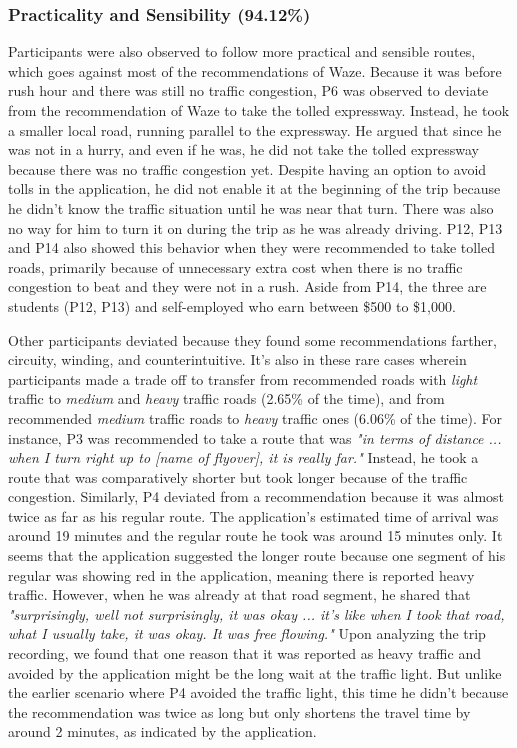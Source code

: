 \subsubsection{Practicality and Sensibility (94.12\%)}
Participants were also observed to follow more practical and sensible routes, which goes against most of the recommendations of Waze. Because it was before rush hour and there was still no traffic congestion, P6 was observed to deviate from the recommendation of Waze to take the tolled expressway. Instead, he took a smaller local road, running parallel to the expressway. He argued that since he was not in a hurry, and even if he was, he did not take the tolled expressway because there was no traffic congestion yet. Despite having an option to avoid tolls in the application, he did not enable it at the beginning of the trip because he didn't know the traffic situation until he was near that turn. There was also no way for him to turn it on during the trip as he was already driving. P12, P13 and P14 also showed this behavior when they were recommended to take tolled roads, primarily because of unnecessary extra cost when there is no traffic congestion to beat and they were not in a rush. Aside from P14, the three are students (P12, P13) and self-employed who earn between \$500 to \$1,000.

Other participants deviated because they found some recommendations farther, circuity, winding, and counterintuitive. It's also in these rare cases wherein participants made a trade off to transfer from recommended roads with \emph{light} traffic to \emph{medium} and \emph{heavy} traffic roads (2.65\% of the time), and from recommended \emph{medium} traffic roads to \emph{heavy} traffic ones (6.06\% of the time). For instance, P3 was recommended to take a route that was \emph{"in terms of distance ... when I turn right up to [name of flyover], it is really far."} Instead, he took a route that was comparatively shorter but took longer because of the traffic congestion. Similarly, P4 deviated from a recommendation because it was almost twice as far as his regular route. The application's estimated time of arrival was around 19 minutes and the regular route he took was around 15 minutes only. It seems that the application suggested the longer route because one segment of his regular was showing red in the application, meaning there is reported heavy traffic. However, when he was already at that road segment, he shared that \emph{"surprisingly, well not surprisingly, it was okay ... it's like when I took that road, what I usually take, it was okay. It was free flowing."} Upon analyzing the trip recording, we found that one reason that it was reported as heavy traffic and avoided by the application might be the long wait at the traffic light. But unlike the earlier scenario where P4 avoided the traffic light, this time he didn't because the recommendation was twice as long but only shortens the travel time by around 2 minutes, as indicated by the application. 

